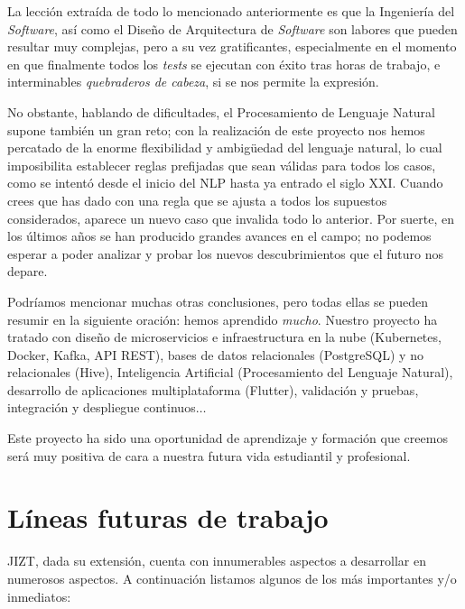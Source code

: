\vspace{-0.3cm}
La lección extraída de todo lo mencionado anteriormente es que la Ingeniería del \emph{Software}, así como el Diseño de Arquitectura de \emph{Software} son labores que pueden resultar muy complejas, pero a su vez gratificantes, especialmente en el momento en que finalmente todos los \emph{tests} se ejecutan con éxito tras horas de trabajo, e interminables \emph{quebraderos de cabeza}, si se nos permite la expresión.

No obstante, hablando de dificultades, el Procesamiento de Lenguaje Natural supone también un gran reto; con la realización de este proyecto nos hemos percatado de la enorme flexibilidad y ambigüedad del lenguaje natural, lo cual imposibilita establecer reglas prefijadas que sean válidas para todos los casos, como se intentó desde el inicio del NLP hasta ya entrado el siglo XXI. Cuando crees que has dado con una regla que se ajusta a todos los supuestos considerados, aparece un nuevo caso que invalida todo lo anterior. Por suerte, en los últimos años se han producido grandes avances en el campo; no podemos esperar a poder analizar y probar los nuevos descubrimientos que el futuro nos depare.

Podríamos mencionar muchas otras conclusiones, pero todas ellas se pueden resumir en la siguiente oración: hemos aprendido \emph{mucho}. Nuestro proyecto ha tratado con diseño de microservicios e infraestructura en la nube (Kubernetes, Docker, Kafka, API REST), bases de datos relacionales (PostgreSQL) y no relacionales (Hive), Inteligencia Artificial (Procesamiento del Lenguaje Natural), desarrollo de aplicaciones multiplataforma (Flutter), validación y pruebas, integración y despliegue continuos$\ldots$

Este proyecto ha sido una oportunidad de aprendizaje y formación que creemos será muy positiva de cara a nuestra futura vida estudiantil y profesional.


\section{Líneas futuras de trabajo}

JIZT, dada su extensión, cuenta con innumerables aspectos a desarrollar en numerosos aspectos. A continuación listamos algunos de los más importantes y/o inmediatos:

